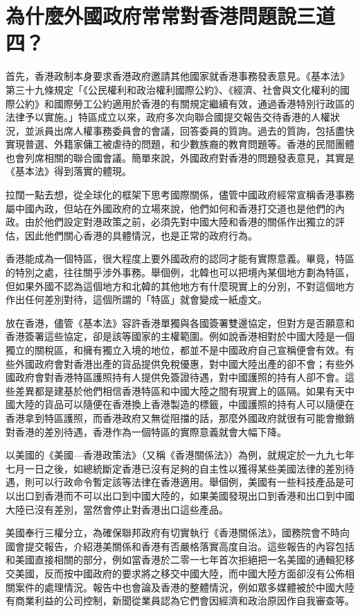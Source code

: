 \section{為什麼外國政府常常對香港問題說三道四？}
\label{sec:sec17}

首先，香港政制本身要求香港政府邀請其他國家就香港事務發表意見。《基本法》第三十九條規定「《公民權利和政治權利國際公約》、《經濟、社會與文化權利的國際公約》和國際勞工公約適用於香港的有關規定繼續有效，通過香港特別行政區的法律予以實施。」特區成立以來，政府多次向聯合國提交報告交待香港的人權狀況，並派員出席人權事務委員會的會議，回答委員的質詢。過去的質詢，包括盡快實現普選、外籍家傭工被虐待的問題，和少數族裔的教育問題等。香港的民間團體也會列席相關的聯合國會議。簡單來說，外國政府對香港的問題發表意見，其實是《基本法》得到落實的體現。

拉闊一點去想，從全球化的框架下思考國際關係，儘管中國政府經常宣稱香港事務屬中國內政，但站在外國政府的立場來說，他們如何和香港打交道也是他們的內政。由於他們設定對港政策之前，必須先對中國大陸和香港的關係作出獨立的評估，因此他們關心香港的具體情況，也是正常的政府行為。

香港能成為一個特區，很大程度上要外國政府的認同才能有實際意義。畢竟，特區的特別之處，往往關乎涉外事務。舉個例，北韓也可以把境內某個地方劃為特區，但如果外國不認為這個地方和北韓的其他地方有什麼現實上的分別，不對這個地方作出任何差別對待，這個所謂的「特區」就會變成一紙虛文。

放在香港，儘管《基本法》容許香港單獨與各國簽署雙邊協定，但對方是否願意和香港簽署這些協定，卻是該等國家的主權範圍。例如說香港相對於中國大陸是一個獨立的關稅區，和擁有獨立入境的地位，都並不是中國政府自己宣稱便會有效。有些外國政府會對香港出產的貨品提供免稅優惠，對中國大陸出產的卻不會；有些外國政府會對香港特區護照持有人提供免簽證待遇，對中國護照的持有人卻不會。這些差異都是建基於他們相信香港特區和中國大陸之間有現實上的區隔。如果有天中國大陸的貨品可以隨便在香港換上香港製造的標籤，中國護照的持有人可以隨便在香港拿到特區護照，而香港政府又無從阻擋的話，那麼外國政府就很有可能會撤銷對香港的差別待遇，香港作為一個特區的實際意義就會大幅下降。

以美國的《美國—香港政策法》（又稱《香港關係法》）為例，就規定於一九九七年七月一日之後，如總統斷定香港已沒有足夠的自主性以獲得某些美國法律的差別待遇，則可以行政命令暫定該等法律在香港適用。舉個例，美國有一些科技產品是可以出口到香港而不可以出口到中國大陸的，如果美國發現出口到香港和出口到中國大陸已沒有差別，當然會停止對香港出口這些產品。

美國奉行三權分立，為確保聯邦政府有切實執行《香港關係法》，國務院會不時向國會提交報告，介紹港美關係和香港有否嚴格落實高度自治。這些報告的內容包括和美國直接相關的部分，例如當香港於二零一七年首次拒絕把一名美國的通輯犯移交美國，反而按中國政府的要求將之移交中國大陸，而中國大陸方面卻沒有公佈相關案件的處理情況。報告中也會論及香港的整體情況，例如眾多媒體被於中國大陸有商業利益的公司控制，新聞從業員認為它們會因經濟和政治原因作自我審查等。

